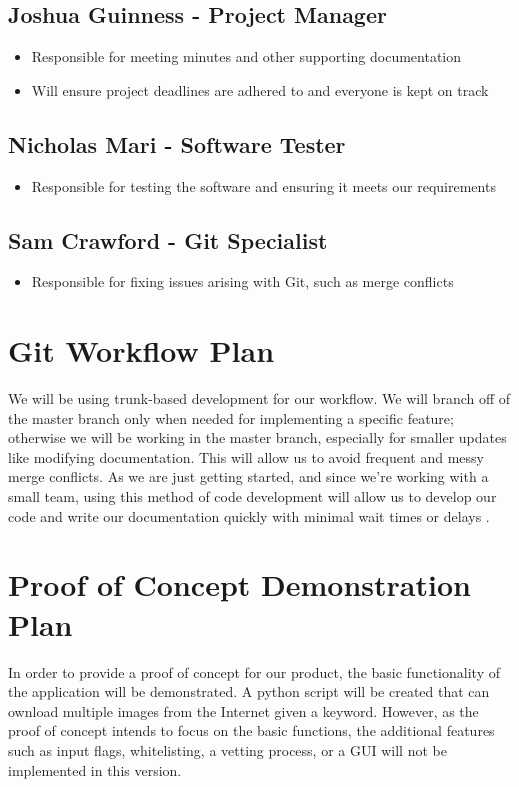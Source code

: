 \documentclass{article}
\begin{document}
\subsection{Joshua Guinness - Project Manager}
\begin{itemize}
\item Responsible for meeting minutes and other supporting documentation
\item Will ensure project deadlines are adhered to and everyone is kept on track
\end{itemize}

\subsection{Nicholas Mari - Software Tester}
\begin{itemize}
\item Responsible for testing the software and ensuring it meets our requirements
\end{itemize}

\subsection{Sam Crawford - Git Specialist}
\begin{itemize}
\item Responsible for fixing issues arising with Git, such as merge conflicts 
\end{itemize}

\section{Git Workflow Plan}
We will be using trunk-based development for our workflow. We will branch off 
of the master branch only when needed for implementing a specific feature; 
otherwise we will be working in the master branch, especially for 
smaller updates like modifying documentation. This will allow us to avoid 
frequent and messy merge conflicts. As we are just getting started, and since 
we’re working with a small team, using this method of code development will 
allow us to develop our code and write our documentation quickly with minimal 
wait times or delays \cite{trunkbased}.

\section{Proof of Concept Demonstration Plan}
In order to provide a proof of concept for our product, the basic functionality
of the application will be demonstrated. A python script will be created that can
ownload multiple images from the Internet given a keyword. However, as the 
proof of concept intends to focus on the basic functions, the additional 
features such as input flags, whitelisting, a vetting process, or a GUI will not 
be implemented in this version.
\end{document}

